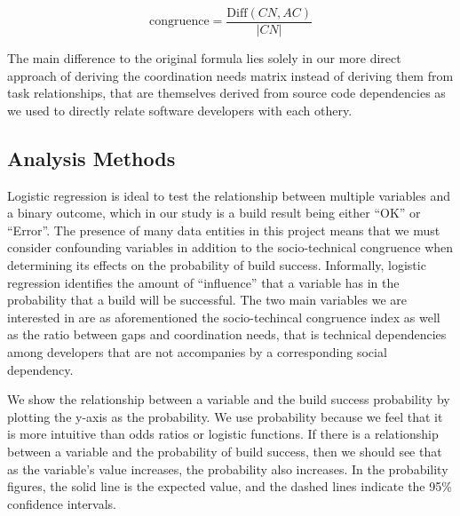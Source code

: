 \[ \text{congruence} = \frac{\text{Diff}(CN, AC)}  {|CN|} \]

The main difference to the original formula lies solely in our more direct approach of deriving the coordination needs matrix instead of deriving them from task relationships, that are themselves derived from source code dependencies as we used to directly relate software developers with each othery.



\subsection{Analysis Methods}
\label{sec:methodology}
Logistic regression is ideal to test the relationship between multiple variables and a binary outcome, which in our study is a build result being either ``OK'' or ``Error''. The presence of many data entities in this project means that we must consider confounding variables in addition to the socio-technical congruence when determining its effects on the probability of build success. Informally, logistic regression identifies the amount of ``influence'' that a variable has in the probability that a build will be successful.
The two main variables we are interested in are as aforementioned the socio-techincal congruence index as well as the ratio between gaps and coordination needs, that is technical dependencies among developers that are not accompanies by a corresponding social dependency.

We show the relationship between a variable and the build success probability by plotting the y-axis as the probability. We use probability because we feel that it is more intuitive than odds ratios or logistic functions. If there is a relationship between a variable and the probability of build success, then we should see that as the variable's value increases, the probability also increases. In the probability figures, the solid line is the expected value, and the dashed lines indicate the 95\% confidence intervals.

